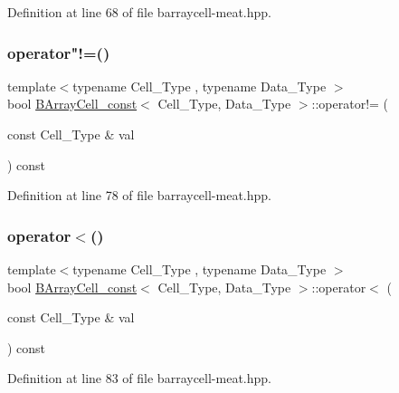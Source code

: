 Definition at line 68 of file barraycell-\/meat.\+hpp.

\mbox{\label{class_b_array_cell__const_a967bb71b2c9efefd1970959e1d498089}} 
\subsubsection{\texorpdfstring{operator"!=()}{operator!=()}}
{\footnotesize\ttfamily template$<$typename Cell\+\_\+\+Type , typename Data\+\_\+\+Type $>$ \\
bool \hyperlink{class_b_array_cell__const}{B\+Array\+Cell\+\_\+const}$<$ Cell\+\_\+\+Type, Data\+\_\+\+Type $>$\+::operator!= (\begin{DoxyParamCaption}\item[{const Cell\+\_\+\+Type \&}]{val }\end{DoxyParamCaption}) const\hspace{0.3cm}{\ttfamily [inline]}}



Definition at line 78 of file barraycell-\/meat.\+hpp.

\mbox{\label{class_b_array_cell__const_a93af7c10baa4961aa71350180e579459}} 
\subsubsection{\texorpdfstring{operator$<$()}{operator<()}}
{\footnotesize\ttfamily template$<$typename Cell\+\_\+\+Type , typename Data\+\_\+\+Type $>$ \\
bool \hyperlink{class_b_array_cell__const}{B\+Array\+Cell\+\_\+const}$<$ Cell\+\_\+\+Type, Data\+\_\+\+Type $>$\+::operator$<$ (\begin{DoxyParamCaption}\item[{const Cell\+\_\+\+Type \&}]{val }\end{DoxyParamCaption}) const\hspace{0.3cm}{\ttfamily [inline]}}



Definition at line 83 of file barraycell-\/meat.\+hpp.

